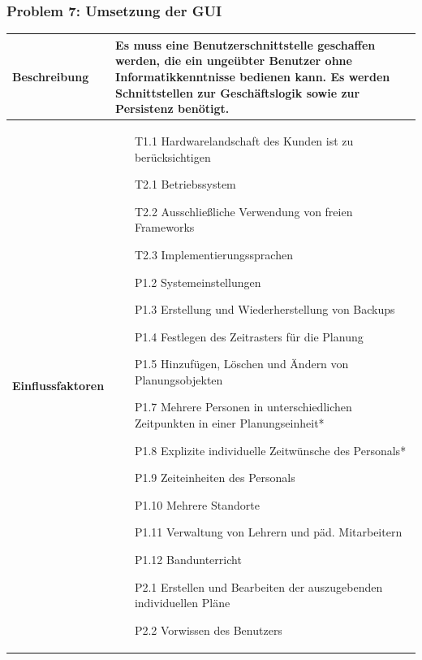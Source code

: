 \documentclass[fontsize=12pt,paper=a4,twoside]{scrartcl}
\begin{document}
\subsubsection{Problem 7: Umsetzung der GUI}
\begin{tabularx}{\textwidth}{|p{6cm}|X|}
 \hline
 \textbf{Beschreibung} & 
Es muss eine Benutzerschnittstelle geschaffen werden, die ein ungeübter Benutzer ohne Informatikkenntnisse bedienen kann. Es werden Schnittstellen zur Geschäftslogik sowie zur Persistenz benötigt. \\\hline
 \textbf{Einflussfaktoren} &
 \begin{itemize}[topsep = 0pt]
\item[T1.1] Hardwarelandschaft des Kunden ist zu berücksichtigen
\item[T2.1] Betriebssystem
\item[T2.2] Ausschließliche Verwendung von freien Frameworks
\item[T2.3] Implementierungssprachen
\item[P1.2] Systemeinstellungen
\item[P1.3] Erstellung und Wiederherstellung von Backups
\item[P1.4] Festlegen des Zeitrasters für die Planung
\item[P1.5] Hinzufügen, Löschen und Ändern von Planungsobjekten
\item[P1.7] Mehrere Personen in unterschiedlichen Zeitpunkten in einer Planungseinheit*
\item[P1.8] Explizite individuelle Zeitwünsche des Personals*
\item[P1.9] Zeiteinheiten des Personals
\item[P1.10] Mehrere Standorte
\item[P1.11] Verwaltung von Lehrern und päd. Mitarbeitern
\item[P1.12] Bandunterricht
\item[P2.1] Erstellen und Bearbeiten der auszugebenden individuellen Pläne
\item[P2.2] Vorwissen des Benutzers
 \end{itemize}\\\hline
 \end{tabularx}
 
\end{document}
